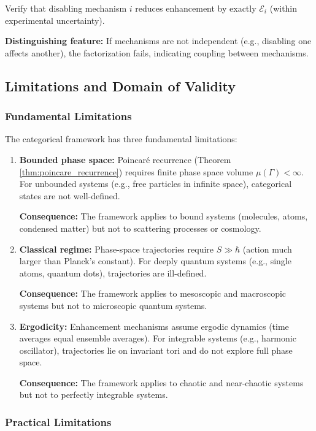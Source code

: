 \documentclass[twocolumn,10pt]{article}
\theoremstyle{remark}
\begin{document}
Verify that disabling mechanism $i$ reduces enhancement by exactly $\mathcal{E}_i$ (within experimental uncertainty).

\textbf{Distinguishing feature:} If mechanisms are not independent (e.g., disabling one affects another), the factorization fails, indicating coupling between mechanisms.

\subsection{Limitations and Domain of Validity}

\subsubsection{Fundamental Limitations}

The categorical framework has three fundamental limitations:

\begin{enumerate}
    \item \textbf{Bounded phase space:} Poincaré recurrence (Theorem \ref{thm:poincare_recurrence}) requires finite phase space volume $\mu(\Gamma) < \infty$. For unbounded systems (e.g., free particles in infinite space), categorical states are not well-defined.

    \textbf{Consequence:} The framework applies to bound systems (molecules, atoms, condensed matter) but not to scattering processes or cosmology.

    \item \textbf{Classical regime:} Phase-space trajectories require $S \gg \hbar$ (action much larger than Planck's constant). For deeply quantum systems (e.g., single atoms, quantum dots), trajectories are ill-defined.

    \textbf{Consequence:} The framework applies to mesoscopic and macroscopic systems but not to microscopic quantum systems.

    \item \textbf{Ergodicity:} Enhancement mechanisms assume ergodic dynamics (time averages equal ensemble averages). For integrable systems (e.g., harmonic oscillator), trajectories lie on invariant tori and do not explore full phase space.

    \textbf{Consequence:} The framework applies to chaotic and near-chaotic systems but not to perfectly integrable systems.
\end{enumerate}

\subsubsection{Practical Limitations}
\end{document}
